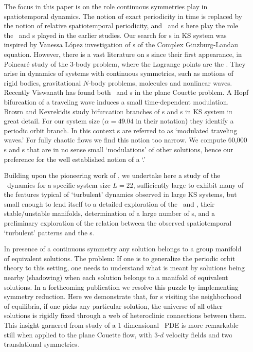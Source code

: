 The focus in this paper is on the role continuous symmetries
play in spatiotemporal dynamics. The notion of exact
periodicity in time is replaced by the notion of relative
spatiotemporal periodicity, and \reqva\ and \rpo s here play
the role the \eqva\ and \po s played in the earlier studies.
Our search for \rpo s in KS system was inspired by Vanessa
L{\'o}pez investigation of {\rpo s} of the
Complex Ginzburg-Landau equation.  However, there is a vast
literature on {\rpo s} since their first appearance, in
Poincar\'e study of the 3-body problem,
where the Lagrange points are the \reqva.  They arise in
dynamics of systems with continuous symmetries, such as
motions of rigid bodies, gravitational $N$-body problems,
molecules and nonlinear waves. Recently Viswanath
has found both \reqva\ and \rpo s in
the plane Couette problem.
A Hopf bifurcation of a traveling
wave induces a small
time-dependent modulation. Brown and Kevrekidis
study bifurcation branches of \po s and \rpo s in KS system
in great detail. For our system size ($\alpha=49.04$ in their
notation) they identify a periodic orbit branch. In this
context \rpo s are referred to as `modulated traveling
waves.' For fully chaotic flows we find this notion too
narrow. We compute 60,000 \po s and \rpo s that are in no
sense small `modulations' of other solutions, hence our
preference for the well established notion of a `\rpo.'
          

Building upon the pioneering work of
, we undertake here a
study of the \KS\ dynamics for a specific system size $L =
22$, sufficiently large to exhibit many of the features
typical of `turbulent' dynamics observed in large KS systems,
but small enough to lend itself to a detailed exploration of
the  \eqva\ and \reqva, their stable/unstable manifolds,
determination of a large number of \rpo s, and a preliminary
exploration of the relation between the observed
spatiotemporal `turbulent' patterns and the \rpo s.

In presence of a continuous symmetry any solution belongs to a group
manifold of equivalent solutions. The problem: If one is to
generalize the periodic orbit theory to this setting, one needs to
understand what is meant by solutions being nearby (shadowing) when
each solution belongs to a manifold of equivalent solutions. In a
forthcoming publication we resolve this puzzle by implementing
symmetry reduction. Here we demonstrate that, for \rpo s visiting the
neighborhood of equilibria, if one picks any
particular solution, the universe of all other solutions is rigidly
fixed through a web of heteroclinic connections between them. This
insight garnered from study of a 1-dimensional \KS\ PDE is more
remarkable still when applied to the plane Couette flow,
with 3-$d$ velocity fields and two translational symmetries.



